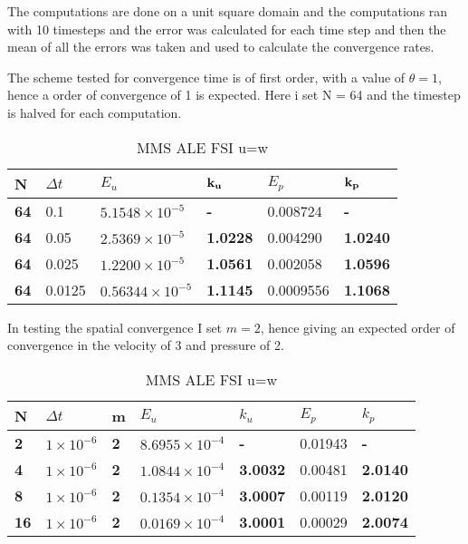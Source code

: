 The computations are done on a unit square domain and the computations ran with 10 timesteps and the error was calculated for each time step and then the mean of all the errors was taken and used to calculate the convergence rates.

The scheme tested for convergence time is of first order, with a value of $\theta = 1$, hence a order of convergence of 1 is expected. Here i set N = 64 and the timestep is halved for each computation.

\begin{table}[H]
\centering
\caption{MMS ALE FSI u=w}
\label{tab:MMS_Flu?id_time}
\begin{tabular}{|l|l|l|l|l|l|}
\hline
\textbf{N} & $\Delta t$ & $E_u$ & $\bold{k_u}$ & $E_p$ & $\bold{k_p}$ \\ \hline
\textbf{64} & 0.1 & $5.1548 \times 10^{-5}$ & \textbf{-} & 0.008724 & \textbf{-} \\ \hline
\textbf{64} & 0.05 & $2.5369 \times 10^{-5}$ & \textbf{1.0228} & 0.004290 & \textbf{1.0240} \\ \hline
\textbf{64} & 0.025 & $1.2200 \times 10^{-5}$ & \textbf{1.0561} & 0.002058 & \textbf{1.0596} \\ \hline
\textbf{64} & 0.0125 & $0.56344 \times 10^{-5}$ & \textbf{1.1145} & 0.0009556 & \textbf{1.1068} \\ \hline
\end{tabular}
\end{table}

In testing the spatial convergence I set $m=2$, hence giving an expected order of convergence in the velocity of 3 and pressure of 2.

\begin{table}[H]
\centering
\caption{MMS ALE FSI u=w}
\label{tab:MMS_Fluid_space}
\begin{tabular}{|l|l|l|l|l|l|l|}
\hline
\textbf{N}  & $\Delta t$ & \textbf{m} & $E_u$                   & \textbf{$k_u$}  & $E_p$   & \textbf{$k_p$}  \\ \hline
\textbf{2}  & $1 \times 10^{-6}$ & \textbf{2} & $8.6955 \times 10^{-4}$ & \textbf{-}      & 0.01943 & \textbf{-}      \\ \hline
\textbf{4}  & $1 \times 10^{-6}$ & \textbf{2} & $1.0844 \times 10^{-4}$ & \textbf{3.0032} & 0.00481 & \textbf{2.0140} \\ \hline
\textbf{8}  & $1 \times 10^{-6}$ & \textbf{2} & $0.1354 \times 10^{-4}$ & \textbf{3.0007} & 0.00119 & \textbf{2.0120} \\ \hline
\textbf{16} & $1 \times 10^{-6}$ & \textbf{2} & $0.0169 \times 10^{-4}$ & \textbf{3.0001} & 0.00029 & \textbf{2.0074} \\ \hline
\end{tabular}
\end{table}

